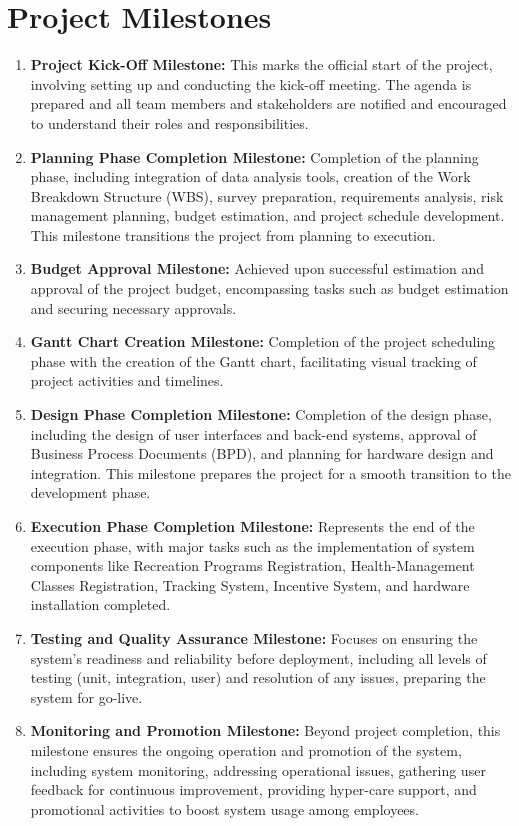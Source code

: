 \section{Project Milestones}
\begin{enumerate}
    \item \textbf{Project Kick-Off Milestone:}
    This marks the official start of the project, involving setting up and conducting the kick-off meeting. The agenda is prepared and all team members and stakeholders are notified and encouraged to understand their roles and responsibilities.
    
    \item \textbf{Planning Phase Completion Milestone:}
    Completion of the planning phase, including integration of data analysis tools, creation of the Work Breakdown Structure (WBS), survey preparation, requirements analysis, risk management planning, budget estimation, and project schedule development. This milestone transitions the project from planning to execution.
    
    \item \textbf{Budget Approval Milestone:}
    Achieved upon successful estimation and approval of the project budget, encompassing tasks such as budget estimation and securing necessary approvals.
    
    \item \textbf{Gantt Chart Creation Milestone:}
    Completion of the project scheduling phase with the creation of the Gantt chart, facilitating visual tracking of project activities and timelines.
    
    \item \textbf{Design Phase Completion Milestone:}
    Completion of the design phase, including the design of user interfaces and back-end systems, approval of Business Process Documents (BPD), and planning for hardware design and integration. This milestone prepares the project for a smooth transition to the development phase.
    
    \item \textbf{Execution Phase Completion Milestone:}
    Represents the end of the execution phase, with major tasks such as the implementation of system components like Recreation Programs Registration, Health-Management Classes Registration, Tracking System, Incentive System, and hardware installation completed.
    
    \item \textbf{Testing and Quality Assurance Milestone:}
    Focuses on ensuring the system's readiness and reliability before deployment, including all levels of testing (unit, integration, user) and resolution of any issues, preparing the system for go-live.
    
    \item \textbf{Monitoring and Promotion Milestone:}
    Beyond project completion, this milestone ensures the ongoing operation and promotion of the system, including system monitoring, addressing operational issues, gathering user feedback for continuous improvement, providing hyper-care support, and promotional activities to boost system usage among employees.
\end{enumerate}